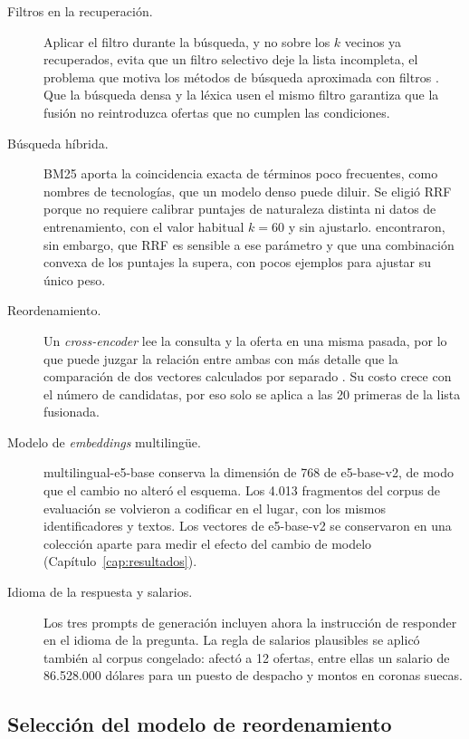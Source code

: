 \begin{description}
    \item[Filtros en la recuperación.] Aplicar el filtro durante la búsqueda, y no sobre los $k$ vecinos ya recuperados, evita que un filtro selectivo deje la lista incompleta, el problema que motiva los métodos de búsqueda aproximada con filtros \citep{Gollapudi2023, Patel2024}. Que la búsqueda densa y la léxica usen el mismo filtro garantiza que la fusión no reintroduzca ofertas que no cumplen las condiciones.
    \item[Búsqueda híbrida.] BM25 aporta la coincidencia exacta de términos poco frecuentes, como nombres de tecnologías, que un modelo denso puede diluir. Se eligió RRF \citep{Cormack2009} porque no requiere calibrar puntajes de naturaleza distinta ni datos de entrenamiento, con el valor habitual $k = 60$ y sin ajustarlo. \citet{Bruch2023} encontraron, sin embargo, que RRF es sensible a ese parámetro y que una combinación convexa de los puntajes la supera, con pocos ejemplos para ajustar su único peso.
    \item[Reordenamiento.] Un \textit{cross-encoder} lee la consulta y la oferta en una misma pasada, por lo que puede juzgar la relación entre ambas con más detalle que la comparación de dos vectores calculados por separado \citep{Nogueira2019}. Su costo crece con el número de candidatas, por eso solo se aplica a las 20 primeras de la lista fusionada.
    \item[Modelo de \textit{embeddings} multilingüe.] multilingual-e5-base \citep{Wang2024mE5} conserva la dimensión de 768 de e5-base-v2, de modo que el cambio no alteró el esquema. Los 4.013 fragmentos del corpus de evaluación se volvieron a codificar en el lugar, con los mismos identificadores y textos. Los vectores de e5-base-v2 se conservaron en una colección aparte para medir el efecto del cambio de modelo (Capítulo~\ref{cap:resultados}).
    \item[Idioma de la respuesta y salarios.] Los tres prompts de generación incluyen ahora la instrucción de responder en el idioma de la pregunta. La regla de salarios plausibles se aplicó también al corpus congelado: afectó a 12 ofertas, entre ellas un salario de 86.528.000 dólares para un puesto de despacho y montos en coronas suecas.
\end{description}

\subsection{Selección del modelo de reordenamiento}

